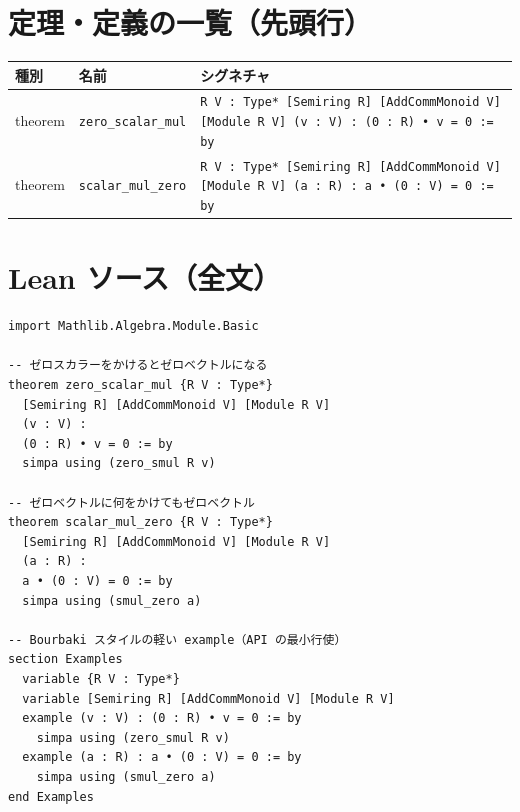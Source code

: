 \documentclass[12pt]{article}
\theoremstyle{definition}
\begin{document}
\section*{定理・定義の一覧（先頭行）}
\begin{center}
\begin{tabular}{lll}
\textbf{種別} & \textbf{名前} & \textbf{シグネチャ} \\ \hline
theorem & \texttt{zero\_scalar\_mul} & \texttt{{R V : Type*} [Semiring R] [AddCommMonoid V] [Module R V] (v : V) : (0 : R) • v = 0 := by} \\
theorem & \texttt{scalar\_mul\_zero} & \texttt{{R V : Type*} [Semiring R] [AddCommMonoid V] [Module R V] (a : R) : a • (0 : V) = 0 := by} \\
\end{tabular}
\end{center}

\section*{Lean ソース（全文）}
\begin{lstlisting}
import Mathlib.Algebra.Module.Basic

-- ゼロスカラーをかけるとゼロベクトルになる
theorem zero_scalar_mul {R V : Type*} 
  [Semiring R] [AddCommMonoid V] [Module R V]
  (v : V) : 
  (0 : R) • v = 0 := by
  simpa using (zero_smul R v)
  
-- ゼロベクトルに何をかけてもゼロベクトル
theorem scalar_mul_zero {R V : Type*} 
  [Semiring R] [AddCommMonoid V] [Module R V]
  (a : R) : 
  a • (0 : V) = 0 := by
  simpa using (smul_zero a)

-- Bourbaki スタイルの軽い example（API の最小行使）
section Examples
  variable {R V : Type*}
  variable [Semiring R] [AddCommMonoid V] [Module R V]
  example (v : V) : (0 : R) • v = 0 := by
    simpa using (zero_smul R v)
  example (a : R) : a • (0 : V) = 0 := by
    simpa using (smul_zero a)
end Examples

\end{lstlisting}
\end{document}
